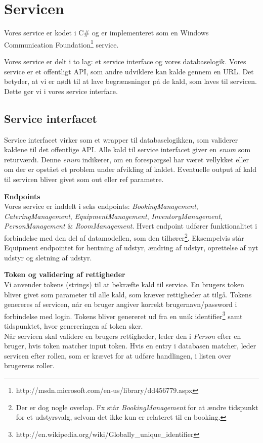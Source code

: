 \section{Servicen}
\label{Technical_Service}
Vores service er kodet i C\# og er implementeret som en Windows Communication Foundation\footnote{http://msdn.microsoft.com/en-us/library/dd456779.aspx} service. 

Vores service er delt i to lag: et service interface og vores databaselogik. Vores service er et offentligt API, som andre udviklere kan kalde gennem en URL. Det betyder, at vi er nødt til at lave begrænsninger på de kald, som laves til servicen. Dette gør vi i vores service interface. 

\subsection*{Service interfacet}
\label{Technical_Service_inter}
Service interfacet virker som et wrapper til databaselogikken, som validerer kaldene til det offentlige API. Alle kald til service interfacet giver en \textit{enum} som returværdi. Denne \textit{enum} indikerer, om en forespørgsel har været vellykket eller om der er opstået et problem under afvikling af kaldet. Eventuelle output af kald til servicen bliver givet som out eller ref parametre.

\textbf{Endpoints}
\\Vores service er inddelt i seks endpoints: \textit{BookingManagement}, \textit{CateringManagement}, \textit{EquipmentManagement}, \textit{InventoryManagement}, \textit{PersonManagement} \& \textit{RoomManagement}. Hvert endpoint udfører funktionalitet i forbindelse med den del af datamodellen, som den tilhører\footnote{Der er dog nogle overlap. Fx står \textit{BookingManagement} for at ændre tidspunkt for et udstyrsvalg, selvom det ikke kun er relateret til en booking.}. Eksempelvis står Equipment endpointet for hentning af udstyr, ændring af udstyr, oprettelse af nyt udstyr og sletning af udstyr. 

\textbf{Token og validering af rettigheder}
\\Vi anvender tokens (strings) til at bekræfte kald til service. En brugers token bliver givet som parameter til alle kald, som kræver rettigheder at tilgå. Tokens genereres af servicen, når en bruger angiver korrekt brugernavn/password i forbindelse med login. Tokens bliver genereret ud fra en unik identifier\footnote{http://en.wikipedia.org/wiki/Globally\_unique\_identifier} samt tidspunktet, hvor genereringen af token sker.
\\Når servicen skal validere en brugers rettigheder, leder den i \textit{Person} efter en bruger, hvis token matcher input token. Hvis en entry i databasen matcher, leder servicen efter rollen, som er krævet for at udføre handlingen, i listen over brugerens roller.

